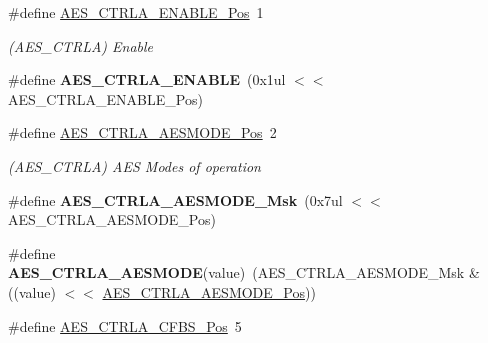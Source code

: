\begin{DoxyCompactItemize}
\item 
\hypertarget{group___s_a_m_l21___a_e_s_ga852dce37626d080c1920f4a78fd39082}{}\#define \hyperlink{group___s_a_m_l21___a_e_s_ga852dce37626d080c1920f4a78fd39082}{A\+E\+S\+\_\+\+C\+T\+R\+L\+A\+\_\+\+E\+N\+A\+B\+L\+E\+\_\+\+Pos}~1\label{group___s_a_m_l21___a_e_s_ga852dce37626d080c1920f4a78fd39082}

\begin{DoxyCompactList}\small\item\em (A\+E\+S\+\_\+\+C\+T\+R\+L\+A) Enable \end{DoxyCompactList}\item 
\hypertarget{group___s_a_m_l21___a_e_s_ga403fdb8bdab7b5178453848ed44e121d}{}\#define {\bfseries A\+E\+S\+\_\+\+C\+T\+R\+L\+A\+\_\+\+E\+N\+A\+B\+L\+E}~(0x1ul $<$$<$ A\+E\+S\+\_\+\+C\+T\+R\+L\+A\+\_\+\+E\+N\+A\+B\+L\+E\+\_\+\+Pos)\label{group___s_a_m_l21___a_e_s_ga403fdb8bdab7b5178453848ed44e121d}

\item 
\hypertarget{group___s_a_m_l21___a_e_s_ga34f19d66a686bd490bdca835622d028c}{}\#define \hyperlink{group___s_a_m_l21___a_e_s_ga34f19d66a686bd490bdca835622d028c}{A\+E\+S\+\_\+\+C\+T\+R\+L\+A\+\_\+\+A\+E\+S\+M\+O\+D\+E\+\_\+\+Pos}~2\label{group___s_a_m_l21___a_e_s_ga34f19d66a686bd490bdca835622d028c}

\begin{DoxyCompactList}\small\item\em (A\+E\+S\+\_\+\+C\+T\+R\+L\+A) A\+E\+S Modes of operation \end{DoxyCompactList}\item 
\hypertarget{group___s_a_m_l21___a_e_s_gad76a6adcd9f7cba3d63d0b3616971a65}{}\#define {\bfseries A\+E\+S\+\_\+\+C\+T\+R\+L\+A\+\_\+\+A\+E\+S\+M\+O\+D\+E\+\_\+\+Msk}~(0x7ul $<$$<$ A\+E\+S\+\_\+\+C\+T\+R\+L\+A\+\_\+\+A\+E\+S\+M\+O\+D\+E\+\_\+\+Pos)\label{group___s_a_m_l21___a_e_s_gad76a6adcd9f7cba3d63d0b3616971a65}

\item 
\hypertarget{group___s_a_m_l21___a_e_s_ga38d0e4ce6ddcecd130f0bc4553c96ce2}{}\#define {\bfseries A\+E\+S\+\_\+\+C\+T\+R\+L\+A\+\_\+\+A\+E\+S\+M\+O\+D\+E}(value)~(A\+E\+S\+\_\+\+C\+T\+R\+L\+A\+\_\+\+A\+E\+S\+M\+O\+D\+E\+\_\+\+Msk \& ((value) $<$$<$ \hyperlink{group___s_a_m_l21___a_e_s_ga34f19d66a686bd490bdca835622d028c}{A\+E\+S\+\_\+\+C\+T\+R\+L\+A\+\_\+\+A\+E\+S\+M\+O\+D\+E\+\_\+\+Pos}))\label{group___s_a_m_l21___a_e_s_ga38d0e4ce6ddcecd130f0bc4553c96ce2}

\item 
\hypertarget{group___s_a_m_l21___a_e_s_gaed0081b2f8068882e43b04bd39c0558f}{}\#define \hyperlink{group___s_a_m_l21___a_e_s_gaed0081b2f8068882e43b04bd39c0558f}{A\+E\+S\+\_\+\+C\+T\+R\+L\+A\+\_\+\+C\+F\+B\+S\+\_\+\+Pos}~5\label{group___s_a_m_l21___a_e_s_gaed0081b2f8068882e43b04bd39c0558f}


\end{DoxyCompactItemize}

